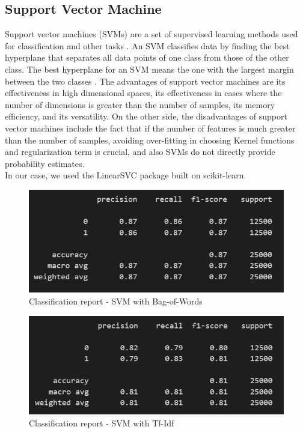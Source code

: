 \documentclass[fleqn,10pt]{SelfArx} %
\begin{document}
\subsection{Support Vector Machine}
Support vector machines (SVMs) are a set of supervised learning methods used for classification and other tasks \cite{SVM}. An SVM classifies data by finding the best hyperplane that separates all data points of one class from those of the other class. The best hyperplane for an SVM means the one with the largest margin between the two classes \cite{SVM2}. The advantages of support vector machines are its effectiveness in high dimensional spaces, its effectiveness in cases where the number of dimensions is greater than the number of samples, its memory efficiency, and its versatility. On the other side, the disadvantages of support vector machines include the fact that if the number of features is much greater than the number of samples, avoiding over-fitting in choosing Kernel functions and regularization term is crucial, and also SVMs do not directly provide probability estimates.\\
In our case, we used the LinearSVC package built on scikit-learn.

\begin{figure}[H]
\begin{center}
  \includegraphics[scale=0.6]{./images/SVM_BoW.png}
\end{center}
  \caption{Classification report - SVM with Bag-of-Words}
\end{figure}

\begin{figure}[H]
\begin{center}
  \includegraphics[scale=0.6]{./images/SVM_TFIDF.png}
\end{center}
  \caption{Classification report - SVM with Tf-Idf}
\end{figure}
\end{document}
